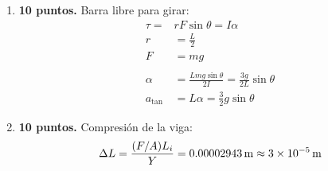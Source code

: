 \documentclass{article}
\begin{document}
\begin{enumerate}
\item \textbf{10 puntos.} Barra libre para girar:
\begin{align*}
\tau =& rF \sin \theta = I \alpha \\
r &= \frac{L}{2} \\
F &= mg \\ \\
\alpha &= \frac{Lmg \sin \theta}{2I} = \frac{3g}{2L}\sin \theta \\
a_{\tan} &= L \alpha = \frac{3}{2}g\sin \theta
\end{align*}

\item \textbf{10 puntos.} Compresión de la viga:
\begin{equation*}
\Delta L  =  \frac{(F/A) L_{i}}{Y} = 0.00002943\text{\,m} 
\approx 3 \times 10^{-5}\text{\,m}
\end{equation*}

\end{enumerate}
\end{document}
